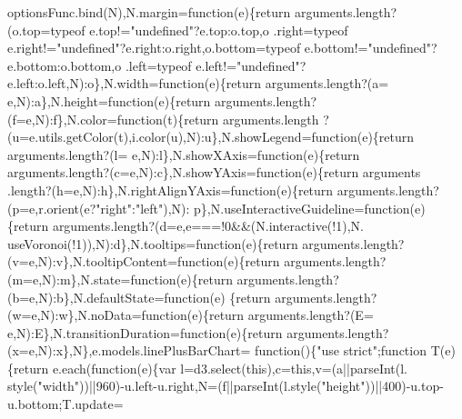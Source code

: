 \begin{DoxyCode}
{      optionsFunc.bind(N),N.margin=\textcolor{keyword}{function}(e)\{\textcolor{keywordflow}{return} arguments.length?(o.top=typeof e.top!=\textcolor{stringliteral}{"undefined"}?e.top:o.top,o
      .right=typeof e.right!=\textcolor{stringliteral}{"undefined"}?e.right:o.right,o.bottom=typeof e.bottom!=\textcolor{stringliteral}{"undefined"}?e.bottom:o.bottom,o
      .left=typeof e.left!=\textcolor{stringliteral}{"undefined"}?e.left:o.left,N):o\},N.width=\textcolor{keyword}{function}(e)\{\textcolor{keywordflow}{return} arguments.length?(a=
      e,N):a\},N.height=\textcolor{keyword}{function}(e)\{\textcolor{keywordflow}{return} arguments.length?(f=e,N):f\},N.color=\textcolor{keyword}{function}(t)\{\textcolor{keywordflow}{return} arguments.length
      ?(u=e.utils.getColor(t),i.color(u),N):u\},N.showLegend=\textcolor{keyword}{function}(e)\{\textcolor{keywordflow}{return} arguments.length?(l=
      e,N):l\},N.showXAxis=\textcolor{keyword}{function}(e)\{\textcolor{keywordflow}{return} arguments.length?(c=e,N):c\},N.showYAxis=\textcolor{keyword}{function}(e)\{\textcolor{keywordflow}{return} arguments
      .length?(h=e,N):h\},N.rightAlignYAxis=\textcolor{keyword}{function}(e)\{\textcolor{keywordflow}{return} arguments.length?(p=e,r.orient(e?\textcolor{stringliteral}{"right"}:\textcolor{stringliteral}{"left"}),N):
      p\},N.useInteractiveGuideline=\textcolor{keyword}{function}(e)\{\textcolor{keywordflow}{return} arguments.length?(d=e,e===!0&&(N.interactive(!1),N.
      useVoronoi(!1)),N):d\},N.tooltips=\textcolor{keyword}{function}(e)\{\textcolor{keywordflow}{return} arguments.length?(v=e,N):v\},N.tooltipContent=\textcolor{keyword}{function}(e)\{\textcolor{keywordflow}{return} 
      arguments.length?(m=e,N):m\},N.state=\textcolor{keyword}{function}(e)\{\textcolor{keywordflow}{return} arguments.length?(b=e,N):b\},N.defaultState=\textcolor{keyword}{function}(e)
      \{\textcolor{keywordflow}{return} arguments.length?(w=e,N):w\},N.noData=\textcolor{keyword}{function}(e)\{\textcolor{keywordflow}{return} arguments.length?(E=
      e,N):E\},N.transitionDuration=\textcolor{keyword}{function}(e)\{\textcolor{keywordflow}{return} arguments.length?(x=e,N):x\},N\},e.models.linePlusBarChart=\textcolor{keyword}{
      function}()\{\textcolor{stringliteral}{"use strict"};\textcolor{keyword}{function} T(e)\{\textcolor{keywordflow}{return} e.each(\textcolor{keyword}{function}(e)\{var l=d3.select(\textcolor{keyword}{this}),c=\textcolor{keyword}{this},v=(a||parseInt(l.
      style(\textcolor{stringliteral}{"width"}))||960)-u.left-u.right,N=(f||parseInt(l.style(\textcolor{stringliteral}{"height"}))||400)-u.top-u.bottom;T.update=\textcolor{keyword}{
}}
\end{DoxyCode}
